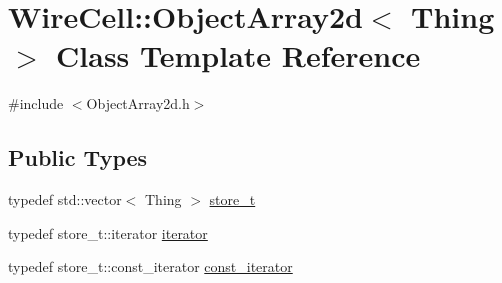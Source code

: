 \hypertarget{class_wire_cell_1_1_object_array2d}{}\section{Wire\+Cell\+:\+:Object\+Array2d$<$ Thing $>$ Class Template Reference}
\label{class_wire_cell_1_1_object_array2d}


{\ttfamily \#include $<$Object\+Array2d.\+h$>$}

\subsection*{Public Types}
\begin{DoxyCompactItemize}
\item 
typedef std\+::vector$<$ Thing $>$ \hyperlink{class_wire_cell_1_1_object_array2d_af40c546ff8c0417e73454fe88360d690}{store\+\_\+t}
\item 
typedef store\+\_\+t\+::iterator \hyperlink{class_wire_cell_1_1_object_array2d_a08055a2eb80a3d4de9dcd72e5da07227}{iterator}
\item 
typedef store\+\_\+t\+::const\+\_\+iterator \hyperlink{class_wire_cell_1_1_object_array2d_a4ac09025b41a1ab92f472eeae2cc0352}{const\+\_\+iterator}
\end{DoxyCompactItemize}
